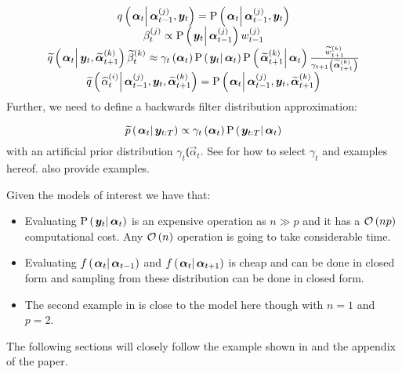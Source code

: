 \begin{equation}\begin{matrix}
	\IDC{\vec{\alpha}_t}{\partic{\vec{\alpha}}{t-1}{j}, \vec{y}_t} = \propC{\vec{\alpha}_t}{\partic{\vec{\alpha}}{t-1}{j}, \vec{y}_t} \\
	\partic{\beta}{t}{j} \propto \propC{\vec{y}_t}{\partic{\vec{\alpha}}{t-1}{j}}\partic{w}{t-1}{j} \\
%
	\IDAproxC{\vec{\alpha}_t}{\vec{y}_t, \particB{\vec{\alpha}}{t + 1}{k}}\particB{\beta}{t}{k} \approx %
		\gamma_t\Lparen{\vec{\alpha}_t}
		\propC{\vec{y}_t}{\vec{\alpha}_t}
		\propC{\particB{\vec{\alpha}}{t + 1}{k}}{\vec{\alpha}_t}
		\frac{\particB{w}{t + 1}{k}}{\gamma_{t + 1}\Lparen{\particB{\vec{\alpha}}{t + 1}{k}}} \\
%
	\IDAproxC{\particS{\alpha}{t}{i}}{\partic{\vec{\alpha}}{t-1}{j},\vec{y}_t, \particB{\vec{\alpha}}{t+1}{k}} = 
		\propC{\vec{\alpha}_t}{\partic{\vec{\alpha}}{t-1}{j},\vec{y}_t, \particB{\vec{\alpha}}{t+1}{k}}
\end{matrix}\end{equation}%
%
Further, we need to define a backwards filter distribution approximation:

\begin{equation}
	\propAproxC{\vec{\alpha}_t}{\vec{y}_{t:T}} \propto \gamma_t \Lparen{\vec{\alpha}_t}\propC{\vec{y}_{t:T}}{\vec{\alpha}_t}
\end{equation}%
%
with an artificial prior distribution $\gamma_t \Lparen{\vec{\alpha}_t}$. See \cite{briers10} for how to select $\gamma_t$ and examples hereof. \cite{fearnhead10} also provide examples. 

Given the models of interest we have that:

\begin{itemize}
	\item Evaluating $\propC{\vec{y}_t}{\vec{\alpha}_t}$ is an expensive operation as $n \gg p$ and it has a $\mathcal{O}\left( np\right)$ computational cost. Any $\mathcal{O}\left( n\right)$ operation is going to take considerable time. 
	\item Evaluating $\optorC{f}{\vec{\alpha}_t}{\vec{\alpha}_{t -1}}$ and $\optorC{f}{\vec{\alpha}_t}{\vec{\alpha}_{t + 1}}$ is cheap and can be done in closed form and sampling from these distribution can be done in closed form.
	\item The second example in \cite{fearnhead10} is close to the model here though with $n = 1$ and $p = 2$. 
\end{itemize}

The following sections will closely follow the example shown in \cite{fearnhead10} and the appendix of the paper. 

